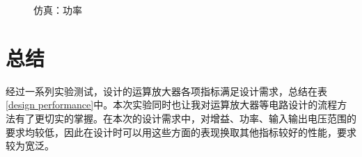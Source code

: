 \documentclass[UTF8]{ctexart}
\numberwithin{figure}{subsection}
\numberwithin{table}{subsection}
\numberwithin{equation}{subsection}
\begin{document}
\begin{figure}[H]
    \centering
    \caption{仿真：功率}
    \label{Pdiss simulation}
\end{figure}

\section{总结}
经过一系列实验测试，设计的运算放大器各项指标满足设计需求，总结在表\ref{design performance}中。本次实验同时也让我对运算放大器等电路设计的流程方法有了更切实的掌握。在本次的设计需求中，对增益、功率、输入输出电压范围的要求均较低，因此在设计时可以用这些方面的表现换取其他指标较好的性能，要求较为宽泛。
\end{document}
